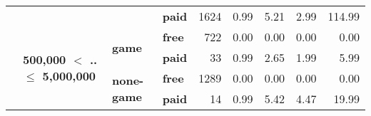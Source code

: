 \begin{tabular}{llll|rrrrr}
      &                                 &           & \textbf{paid} &   1624 &     0.99 &       5.21 &       2.99 &        114.99 \\
\cline{2-9}
\cline{3-9}
      & \multirow{4}{*}{\textbf{500,000 $<$ .. $\leq$ 5,000,000}} & \multirow{2}{*}{\textbf{game}} & \textbf{free} &    722 &     0.00 &       0.00 &       0.00 &          0.00 \\
      &                                 &           & \textbf{paid} &     33 &     0.99 &       2.65 &       1.99 &          5.99 \\
\cline{3-9}
      &                                 & \multirow{2}{*}{\textbf{none-game}} & \textbf{free} &   1289 &     0.00 &       0.00 &       0.00 &          0.00 \\
      &                                 &           & \textbf{paid} &     14 &     0.99 &       5.42 &       4.47 &         19.99 \\
\bottomrule
\end{tabular}
